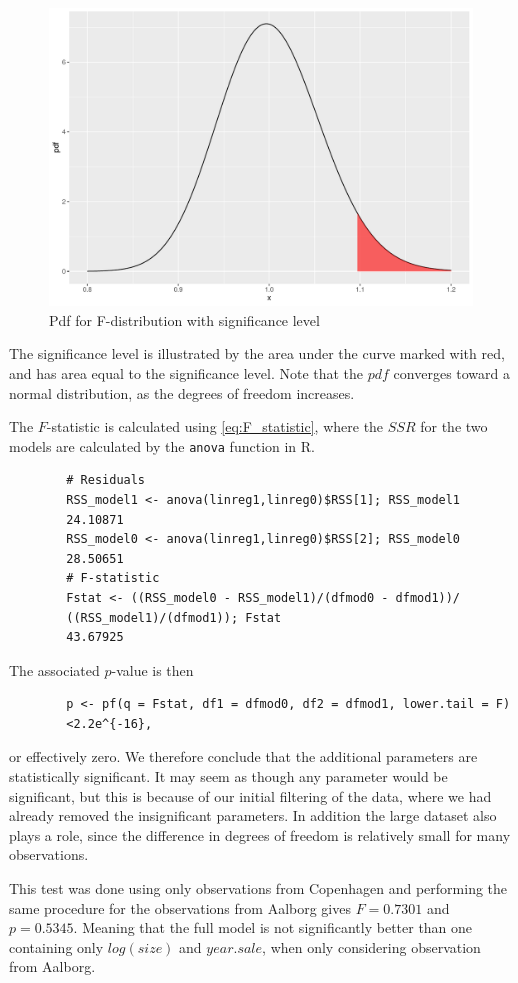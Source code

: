     \begin{figure}[H]
        \centering
      \includegraphics[width = 0.5 \textwidth]{figures/Fdistsign.pdf}
      \caption{Pdf for F-distribution with significance level}
      \label{fig:my_label}
    \end{figure}
    
    The significance level is illustrated by the area under the curve marked with red, and has area equal to the significance level. Note that the $pdf$ converges toward a normal distribution, as the degrees of freedom increases.
    
    The $F$-statistic is calculated using \eqref{eq:F_statistic}, where the $SSR$ for the two models are calculated by the \texttt{anova} function in R. 
    \begin{lstlisting}
        # Residuals
        RSS_model1 <- anova(linreg1,linreg0)$RSS[1]; RSS_model1
        24.10871
        RSS_model0 <- anova(linreg1,linreg0)$RSS[2]; RSS_model0
        28.50651
        # F-statistic
        Fstat <- ((RSS_model0 - RSS_model1)/(dfmod0 - dfmod1))/
        ((RSS_model1)/(dfmod1)); Fstat
        43.67925
    \end{lstlisting}
    
    The associated $p$-value is then
    
    \begin{lstlisting}
        p <- pf(q = Fstat, df1 = dfmod0, df2 = dfmod1, lower.tail = F)
        <2.2e^{-16},
    \end{lstlisting}
    
    or effectively zero. We therefore conclude that the additional parameters are statistically significant.
    It may seem as though any parameter would be significant, but this is because of our initial filtering of the data, where we had already removed the insignificant parameters.
    In addition the large dataset also plays a role, since the difference in degrees of freedom is relatively small for many observations. 
    
    This test was done using only observations from Copenhagen and performing the same procedure for the observations from Aalborg gives $F=0.7301$ and $p=0.5345$.
    Meaning that the full model is not significantly better than one containing only $log(size)$ and $year.sale$, when only considering observation from Aalborg. 
    
